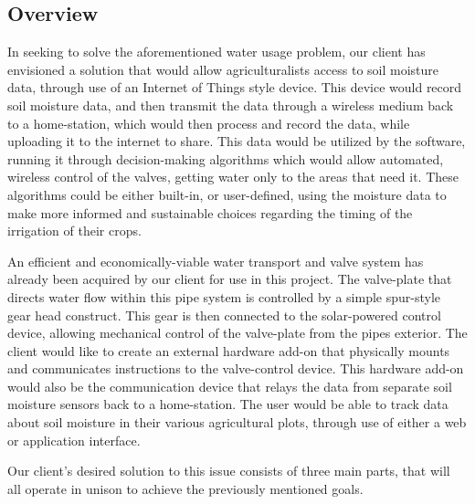 \documentclass[onecolumn, draftclsnofoot,10pt, compsoc]{IEEEtran}
\begin{document}
	\subsection{Overview}
	In seeking to solve the aforementioned water usage problem, our client has envisioned a solution that would allow agriculturalists access to soil moisture data, through use of an Internet of Things style device.
	This device would record soil moisture data, and then transmit the data through a wireless medium back to a home-station, which would then process and record the data, while uploading it to the internet to share.
	This data would be utilized by the software, running it through decision-making algorithms which would allow automated, wireless control of the valves, getting water only to the areas that need it.
	These algorithms could be either built-in, or user-defined, using the moisture data to make more informed and sustainable choices regarding the timing of the irrigation of their crops.
	
	An efficient and economically-viable water transport and valve system has already been acquired by our client for use in this project.
	The valve-plate that directs water flow within this pipe system is controlled by a simple spur-style gear head construct.
	This gear is then connected to the solar-powered control device, allowing mechanical control of the valve-plate from the pipes exterior.
	The client would like to create an external hardware add-on that physically mounts and communicates instructions to the valve-control device.
	This hardware add-on would also be the communication device that relays the data from separate soil moisture sensors back to a home-station.
	The user would be able to track data about soil moisture in their various agricultural plots, through use of either a web or application interface.
	
	Our client's desired solution to this issue consists of three main parts, that will all operate in unison to achieve the previously mentioned goals.
	
\end{document}
